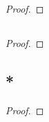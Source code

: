 \subsection{}
\begin{proof}
	
\end{proof}

\subsection{}
\begin{proof}
	
\end{proof}

\subsection{*}
\begin{proof}
	
\end{proof}
